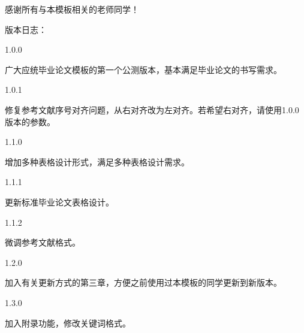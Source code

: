 \acknowledgement
感谢所有与本模板相关的老师同学！\par
版本日志：\par
1.0.0\par
广大应统毕业论文模板的第一个公测版本，基本满足毕业论文的书写需求。\par
1.0.1\par
修复参考文献序号对齐问题，从右对齐改为左对齐。若希望右对齐，请使用1.0.0版本的参数。\par
1.1.0\par
增加多种表格设计形式，满足多种表格设计需求。\par
1.1.1\par
更新标准毕业论文表格设计。\par
1.1.2\par
微调参考文献格式。\par
1.2.0\par
加入有关更新方式的第三章，方便之前使用过本模板的同学更新到新版本。\par
1.3.0\par
加入附录功能，修改关键词格式。
\newpage
\cleardoublepage